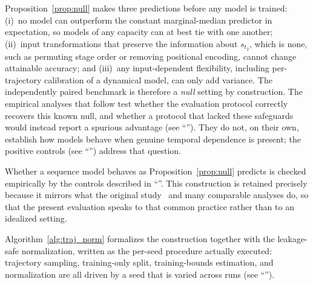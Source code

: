 \documentclass[10pt,letterpaper]{article}
\begin{document}
Proposition~\ref{prop:null} makes three predictions before any model is trained: (i)~no model can outperform the constant marginal-median predictor in expectation, so models of any capacity can at best tie with one another; (ii)~input transformations that preserve the information about $s_{t_2}$, which is none, such as permuting stage order or removing positional encoding, cannot change attainable accuracy; and (iii)~any input-dependent flexibility, including per-trajectory calibration of a dynamical model, can only add variance. The independently paired benchmark is therefore a \emph{null} setting by construction. The empirical analyses that follow test whether the evaluation protocol correctly recovers this known null, and whether a protocol that lacked these safeguards would instead report a spurious advantage (see ``''). They do not, on their own, establish how models behave when genuine temporal dependence is present; the positive controls (see ``'') address that question.

Whether a sequence model behaves as Proposition~\ref{prop:null} predicts is checked empirically by the controls described in ``''. This construction is retained precisely because it mirrors what the original study~\cite{kanu2026transformer} and many comparable analyses do, so that the present evaluation speaks to that common practice rather than to an idealized setting.

Algorithm~\ref{alg:traj_norm} formalizes the construction together with the leakage-safe normalization, written as the per-seed procedure actually executed: trajectory sampling, training-only split, training-bounds estimation, and normalization are all driven by a seed that is varied across runs (see ``'').
\end{document}
